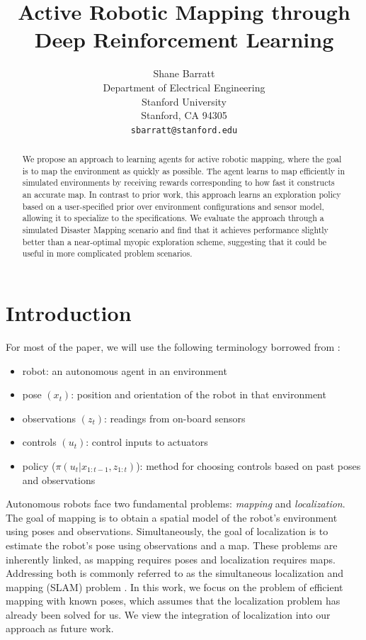 \documentclass{article}
\title{Active Robotic Mapping through Deep Reinforcement Learning}
\author{
  Shane Barratt \\
  Department of Electrical Engineering\\
  Stanford University \\
  Stanford, CA 94305 \\
  \texttt{sbarratt@stanford.edu} \\
}
\begin{document}
\maketitle

\begin{abstract}
We propose an approach to learning agents for active robotic mapping, where the goal is to map the environment as quickly as possible. The agent learns to map efficiently in simulated environments by receiving rewards corresponding to how fast it constructs an accurate map. In contrast to prior work, this approach learns an exploration policy based on a user-specified prior over environment configurations and sensor model, allowing it to specialize to the specifications. We evaluate the approach through a simulated Disaster Mapping scenario and find that it achieves performance slightly better than a near-optimal myopic exploration scheme, suggesting that it could be useful in more complicated problem scenarios.
\end{abstract}

\section{Introduction}
For most of the paper, we will use the following terminology borrowed from \cite{thrun2005probabilistic}:
\begin{itemize}
\itemsep0em
\item robot: an autonomous agent in an environment
\item pose $(x_t)$: position and orientation of the robot in that environment
\item observations $(z_t)$: readings from on-board sensors
\item controls $(u_t)$: control inputs to actuators
\item policy ($\pi(u_t|x_{1:t-1}, z_{1:t})$): method for choosing controls based on past poses and observations
\end{itemize}

Autonomous robots face two fundamental problems: \emph{mapping} and \emph{localization}. The goal of mapping is to obtain a spatial model of the robot's environment using poses and observations. Simultaneously, the goal of localization is to estimate the robot's pose using observations and a map. These problems are inherently linked, as mapping requires poses and localization requires maps. Addressing both is commonly referred to as the simultaneous localization and mapping (SLAM) problem \cite{leonard1991mobile}. In this work, we focus on the problem of efficient mapping with known poses, which assumes that the localization problem has already been solved for us. We view the integration of localization into our approach as future work.
\end{document}
